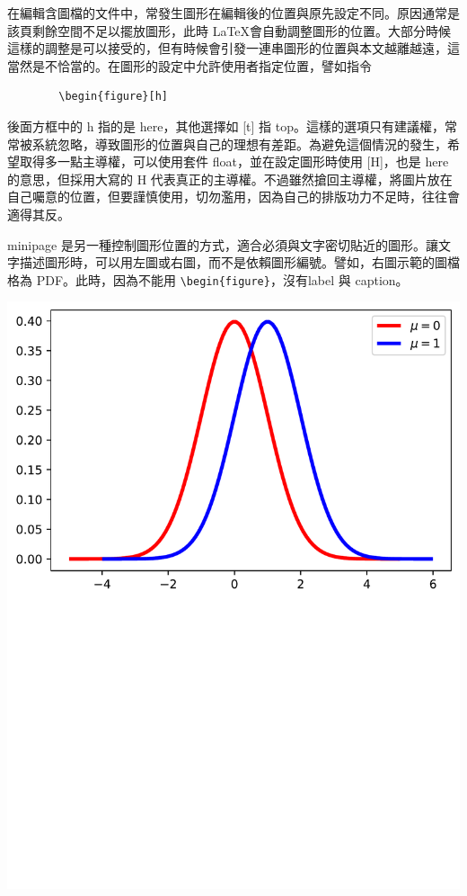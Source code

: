 在編輯含圖檔的文件中，常發生圖形在編輯後的位置與原先設定不同。原因通常是該頁剩餘空間不足以擺放圖形，此時 \LaTeX 會自動調整圖形的位置。大部分時候這樣的調整是可以接受的，但有時候會引發一連串圖形的位置與本文越離越遠，這當然是不恰當的。在圖形的設定中允許使用者指定位置，譬如指令

\bigskip
	\begin{lstlisting}
		\begin{figure}[h]
	\end{lstlisting}
\bigskip
後面方框中的 h 指的是 here，其他選擇如  [t] 指 top。這樣的選項只有建議權，常常被系統忽略，導致圖形的位置與自己的理想有差距。為避免這個情況的發生，希望取得多一點主導權，可以使用套件 float，並在設定圖形時使用  [H]，也是 here 的意思，但採用大寫的  H 代表真正的主導權。不過雖然搶回主導權，將圖片放在自己囑意的位置，但要謹慎使用，切勿濫用，因為自己的排版功力不足時，往往會適得其反。

\begin{minipage}{.4\linewidth}
{\A minipage} 是另一種控制圖形位置的方式，適合必須與文字密切貼近的圖形。讓文字描述圖形時，可以用左圖或右圖，而不是依賴圖形編號。譬如，右圖示範的圖檔格為 PDF。此時，因為不能用 \verb|\begin{figure}|，沒有{\A label} 與  {\A caption}。

\end{minipage}
\begin{minipage}{.6\linewidth}
        \includegraphics[scale=0.3]{test.pdf}
\end{minipage}

